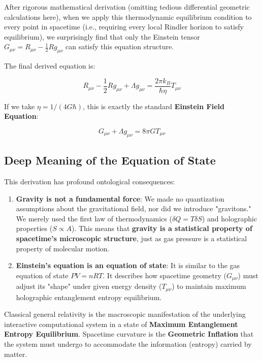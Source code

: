 After rigorous mathematical derivation (omitting tedious differential geometric calculations here), when we apply this thermodynamic equilibrium condition to every point in spacetime (i.e., requiring every local Rindler horizon to satisfy equilibrium), we surprisingly find that only the Einstein tensor $G_{\mu\nu} = R_{\mu\nu} - \frac{1}{2}Rg_{\mu\nu}$ can satisfy this equation structure.

The final derived equation is:

\begin{equation}
R_{\mu\nu} - \frac{1}{2}Rg_{\mu\nu} + \Lambda g_{\mu\nu} = \frac{2\pi k_B}{\hbar \eta} T_{\mu\nu}
\end{equation}

If we take $\eta = 1/(4G\hbar)$, this is exactly the standard \textbf{Einstein Field Equation}:

\begin{equation}
G_{\mu\nu} + \Lambda g_{\mu\nu} = 8\pi G T_{\mu\nu}
\end{equation}

\subsection{Deep Meaning of the Equation of State}

This derivation has profound ontological consequences:

\begin{enumerate}
\item \textbf{Gravity is not a fundamental force}: We made no quantization assumptions about the gravitational field, nor did we introduce "gravitons." We merely used the first law of thermodynamics ($\delta Q = T \delta S$) and holographic properties ($S \propto A$). This means that \textbf{gravity is a statistical property of spacetime's microscopic structure}, just as gas pressure is a statistical property of molecular motion.

\item \textbf{Einstein's equation is an equation of state}: It is similar to the gas equation of state $PV = nRT$. It describes how spacetime geometry ($G_{\mu\nu}$) must adjust its "shape" under given energy density ($T_{\mu\nu}$) to maintain maximum holographic entanglement entropy equilibrium.
\end{enumerate}

\begin{theorem}
Classical general relativity is the macroscopic manifestation of the underlying interactive computational system in a state of \textbf{Maximum Entanglement Entropy Equilibrium}. Spacetime curvature is the \textbf{Geometric Inflation} that the system must undergo to accommodate the information (entropy) carried by matter.
\end{theorem}

